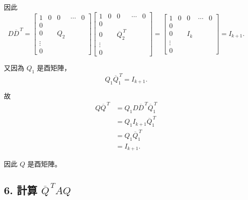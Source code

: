 \documentclass[12pt,a4paper]{article}
\begin{document}
因此
\[
    D\overline{D}^{\,T}
    =
    \left[
        \begin{array}{ccccc}
            1      & 0 & 0   & \cdots & 0 \\
            0      &   &     &        &   \\
            0      &   & Q_2 &        &   \\
            \vdots &   &     &        &   \\
            0      &   &     &        &
        \end{array}
        \right]
    \left[
        \begin{array}{ccccc}
            1      & 0 & 0                    & \cdots & 0 \\
            0      &   &                      &        &   \\
            0      &   & \overline{Q}_2^{\,T} &        &   \\
            \vdots &   &                      &        &   \\
            0      &   &                      &        &
        \end{array}
        \right]
    =
    \left[
        \begin{array}{ccccc}
            1      & 0 & 0   & \cdots & 0 \\
            0      &   &     &        &   \\
            0      &   & I_k &        &   \\
            \vdots &   &     &        &   \\
            0      &   &     &        &
        \end{array}
        \right]
    =
    I_{k+1}.
\]

又因為 $Q_1$ 是酉矩陣，
\[
    Q_1\overline{Q}_1^{\,T}=I_{k+1}.
\]

故
\[
    \begin{aligned}
        Q\overline{Q}^{\,T}
         & =
        Q_1D\overline{D}^{\,T}\overline{Q}_1^{\,T} \\
         & =
        Q_1I_{k+1}\overline{Q}_1^{\,T}             \\
         & =
        Q_1\overline{Q}_1^{\,T}                    \\
         & =
        I_{k+1}.
    \end{aligned}
\]

因此 $Q$ 是酉矩陣。

\subsection*{6. 計算 $\overline{Q}^{\,T}AQ$}
\end{document}
